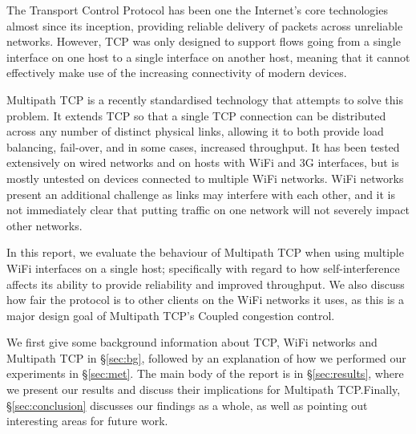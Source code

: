 The Transport Control Protocol has been one the Internet's core technologies almost since its inception, providing reliable delivery of packets across unreliable
networks. However, TCP was only designed to support flows going from a single
interface on one host to a single interface on another host, meaning that it cannot
effectively make use of the increasing connectivity of modern devices.

Multipath TCP is a recently standardised technology that attempts to solve this
problem. It extends TCP so that a single TCP connection can be distributed
across any number of distinct physical links, allowing it to both provide load
balancing, fail-over, and in some cases, increased throughput. It has been
tested extensively on wired networks and on hosts with WiFi and 3G interfaces,
but is mostly untested on devices connected to multiple WiFi networks.
WiFi networks present an additional challenge as links may interfere with each
other, and it is not immediately clear that putting traffic on one network will
not severely impact other networks.

In this report, we evaluate the behaviour of Multipath TCP when using multiple
WiFi interfaces on a single host; specifically with regard to how
self-interference affects its ability to provide reliability and improved
throughput. We also discuss how fair the protocol is to other clients on the WiFi
networks it uses, as this is a major design goal of Multipath TCP's Coupled
congestion control.

We first give some background information about TCP, WiFi networks and Multipath
TCP in \S\ref{sec:bg}, followed by an explanation of how we performed our
experiments in \S\ref{sec:met}. The main body of the report is in
\S\ref{sec:results}, where we present our results and discuss their implications
for Multipath TCP.\@ Finally, \S\ref{sec:conclusion} discusses our findings as a
whole, as well as pointing out interesting areas for future work.

